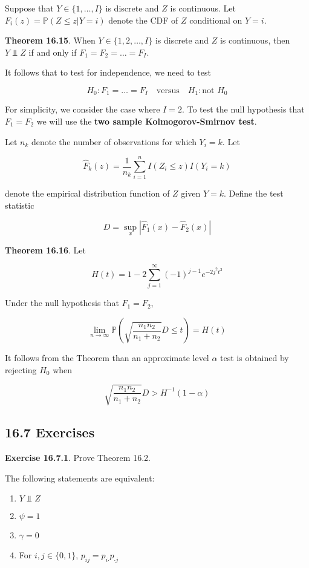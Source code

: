 Suppose that \(Y \in \{ 1, \dots, I \}\) is discrete and \(Z\) is
continuous. Let \(F_{i}(z) = \mathbb{P}(Z \leq z | Y = i)\) denote the CDF
of \(Z\) conditional on \(Y = i\).

\textbf{Theorem 16.15}. When \(Y \in \{ 1, 2, \dots, I \}\) is discrete
and \(Z\) is continuous, then \(Y \text{ ⫫ } Z\) if and only if
\(F_{1} = F_{2} = \dots = F_I\).

It follows that to test for independence, we need to test

\[ 
H_{0}: F_{1} = \dots = F_I
\quad \text{versus} \quad
H_{1}: \text{not } H_{0}
\]

For simplicity, we consider the case where \(I = 2\). To test the null
hypothesis that \(F_{1} = F_{2}\) we will use the \textbf{two sample
Kolmogorov-Smirnov test}.

Let \(n_{k}\) denote the number of observations for which \(Y_{i} = k\). Let

\[\hat{F}_{k}(z) = \frac{1}{n_{k}} \sum_{i=1}^{n} I(Z_{i} \leq z) I(Y_{i} = k)\]

denote the empirical distribution function of \(Z\) given \(Y = k\).
Define the test statistic

\[ D = \sup_x | \hat{F}_{1}(x) - \hat{F}_{2}(x) |\]

\textbf{Theorem 16.16}. Let

\[ H(t) = 1 - 2 \sum_{j=1}^{\infty} (-1)^{j-1} e^{-2j^{2}t^{2}} \]

Under the null hypothesis that \(F_{1} = F_{2}\),

\[ \lim_{n \rightarrow \infty} \mathbb{P} \left( \sqrt{\frac{n_{1} n_{2}}{n_{1} + n_{2}}} D \leq t \right) = H(t) \]

It follows from the Theorem than an approximate level \(\alpha\) test is
obtained by rejecting \(H_{0}\) when

\[ \sqrt{\frac{n_{1} n_{2}}{n_{1} + n_{2}}} D > H^{-1}(1 - \alpha) \]

\subsection*{16.7 Exercises}

\textbf{Exercise 16.7.1}. Prove Theorem 16.2.

The following statements are equivalent:

\begin{enumerate}[tightlist,label={\arabic*.}]
\item
  \(Y \text{ ⫫ } Z\)
\item
  \(\psi = 1\)
\item
  \(\gamma = 0\)
\item
  For \(i, j \in \{ 0, 1 \}\), \(p_{ij} = p_{i\text{·}} p_{\text{·}j}\)
\end{enumerate}

